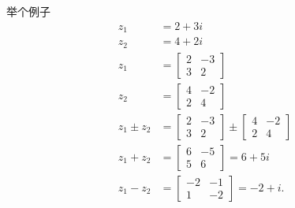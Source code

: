 举个例子
$$
  \begin{aligned}
    z_{1}           & =2+3 i                                                                              \\
    z_{2}           & =4+2 i                                                                              \\
    z_{1}           & =\left[\begin{array}{cc}
        2 & -3 \\
        3 & 2
      \end{array}\right]                                            \\
    z_{2}           & =\left[\begin{array}{cc}
        4 & -2 \\
        2 & 4
      \end{array}\right]                                            \\
    z_{1} \pm z_{2} & =\left[\begin{array}{cc}
        2 & -3 \\
        3 & 2
      \end{array}\right] \pm\left[\begin{array}{cc}
        4 & -2 \\
        2 & 4
      \end{array}\right] \\
    z_{1}+z_{2}     & =\left[\begin{array}{cc}
        6 & -5 \\
        5 & 6
      \end{array}\right]=6+5 i                                      \\
    z_{1}-z_{2}     & =\left[\begin{array}{cc}
        -2 & -1 \\
        1  & -2
      \end{array}\right]=-2+i .
  \end{aligned}
$$

